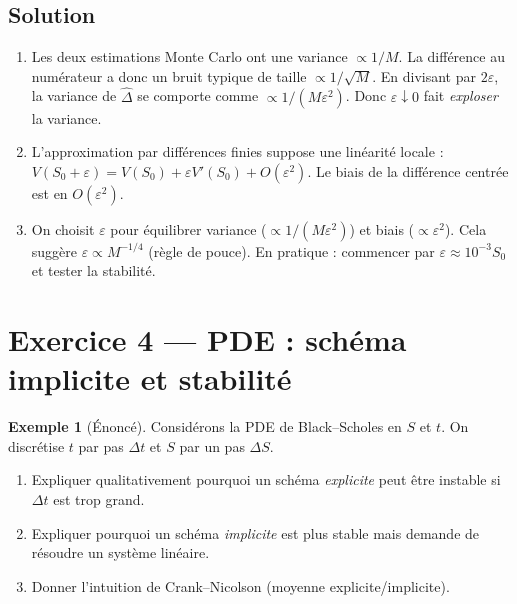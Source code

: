 \documentclass[11pt,a4paper]{report}
\newcommand{\1}{\mathbbm{1}}
\theoremstyle{definition}
\newtheorem{example}{Exemple}[chapter]
\theoremstyle{plain}
\theoremstyle{remark}
\begin{document}
\subsection*{Solution}
\begin{enumerate}[label=\alph*)]
  \item Les deux estimations Monte Carlo ont une variance $\propto 1/M$.
  La différence au numérateur a donc un bruit typique de taille $\propto 1/\sqrt{M}$.
  En divisant par $2\varepsilon$, la variance de $\widehat{\Delta}$ se comporte comme $\propto 1/(M\varepsilon^2)$.
  Donc $\varepsilon\downarrow 0$ fait \emph{exploser} la variance.
  \item L'approximation par différences finies suppose une linéarité locale :
  \(V(S_0+\varepsilon)=V(S_0)+\varepsilon V'(S_0)+O(\varepsilon^2)\).
  Le biais de la différence centrée est en $O(\varepsilon^2)$.
  \item On choisit $\varepsilon$ pour équilibrer variance ($\propto 1/(M\varepsilon^2)$) et biais ($\propto \varepsilon^2$).
  Cela suggère $\varepsilon\propto M^{-1/4}$ (règle de pouce).
  En pratique : commencer par $\varepsilon\approx 10^{-3}S_0$ et tester la stabilité.
\end{enumerate}

\section{Exercice 4 --- PDE : schéma implicite et stabilité}
\begin{example}[Énoncé]
Considérons la PDE de Black--Scholes en $S$ et $t$.
On discrétise $t$ par pas $\Delta t$ et $S$ par un pas $\Delta S$.
\begin{enumerate}[label=\alph*)]
  \item Expliquer qualitativement pourquoi un schéma \emph{explicite} peut être instable si $\Delta t$ est trop grand.
  \item Expliquer pourquoi un schéma \emph{implicite} est plus stable mais demande de résoudre un système linéaire.
  \item Donner l'intuition de Crank--Nicolson (moyenne explicite/implicite).
\end{enumerate}
\end{example}
\end{document}

